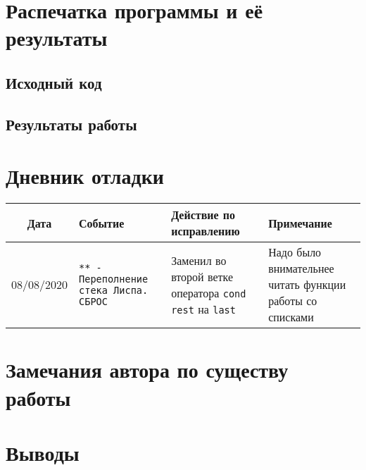 \documentclass[12pt]{article}
\begin{document}
\section{Распечатка программы и её результаты}

\subsection{Исходный код}

\subsection{Результаты работы}

\section{Дневник отладки}
\noindent
\begin{tabularx}{\linewidth}{|c|X|X|X|}
\hline
Дата & Событие & Действие по исправлению & Примечание \\
\hline
08/08/2020 & {\tt *** - Переполнение стека Лиспа. СБРОС} & Заменил во второй ветке оператора {\tt cond} {\tt rest} на {\tt last} & Надо было внимательнее читать функции работы со списками\\
\hline
\end{tabularx}

\section{Замечания автора по существу работы}

\section{Выводы}
\end{document}
